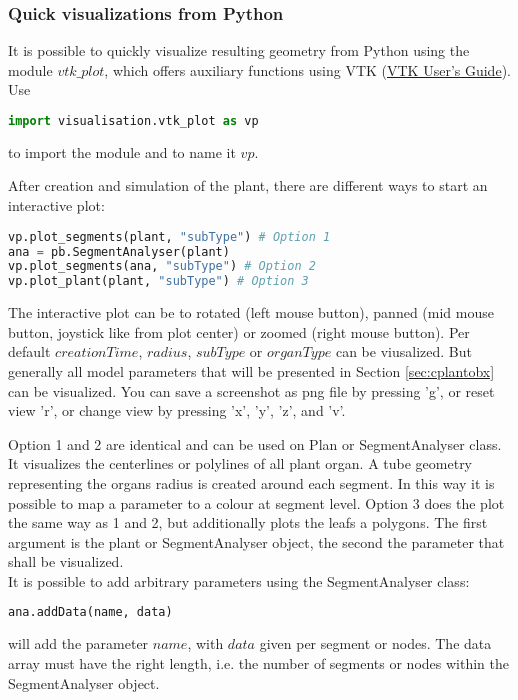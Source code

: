 
\subsubsection*{Quick visualizations from Python}

It is possible to quickly visualize resulting geometry from Python using the module $vtk\_plot$, which offers auxiliary functions using VTK (\href{https://vtk.org/vtk-users-guide/}{VTK User's Guide}). Use 
\begin{lstlisting}[language=Python]
import visualisation.vtk_plot as vp
\end{lstlisting}
to import the module and to name it $vp$.

After creation and simulation of the plant, there are different ways to start an interactive plot:
\begin{lstlisting}[language=Python]
vp.plot_segments(plant, "subType") # Option 1
ana = pb.SegmentAnalyser(plant)
vp.plot_segments(ana, "subType") # Option 2
vp.plot_plant(plant, "subType") # Option 3
\end{lstlisting}
The interactive plot can be to rotated (left mouse button), panned (mid mouse button, joystick like from plot center) or zoomed (right mouse button). Per default $creationTime$, $radius$, $subType$ or $organType$ can be viusalized. But generally all model parameters that will be presented in Section \ref{sec:cplantobx} can be visualized. You can save a screenshot as png file by pressing 'g', or reset view 'r', or change view by pressing 'x', 'y', 'z', and 'v'.

Option 1 and 2 are identical and can be used on Plan or SegmentAnalyser class. It visualizes the centerlines or polylines of all plant organ. A tube geometry representing the organs radius is created around each segment. In this way it is possible to map a parameter to a colour at segment level.  Option 3 does the plot the same way as 1 and 2, but additionally plots the leafs a polygons. The first argument is the plant or SegmentAnalyser object, the second the parameter that shall be visualized. \\

It is possible to add arbitrary parameters using the SegmentAnalyser class: 
\begin{lstlisting}[language=Python]
ana.addData(name, data) 
\end{lstlisting}
will add the parameter $name$, with $data$ given per segment or nodes. The data array must have the right length, i.e. the number of segments or nodes within the SegmentAnalyser object.

